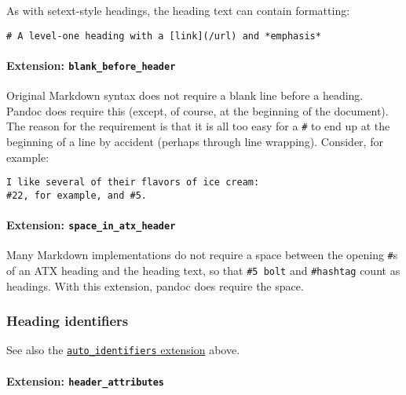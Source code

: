 \documentclass[
]{article}
\begin{document}
As with setext-style headings, the heading text can contain formatting:

\begin{verbatim}
# A level-one heading with a [link](/url) and *emphasis*
\end{verbatim}

\hypertarget{extension-blank_before_header}{%
\paragraph{\texorpdfstring{Extension:
\texttt{blank\_before\_header}}{Extension: blank\_before\_header}}\label{extension-blank_before_header}}

Original Markdown syntax does not require a blank line before a heading.
Pandoc does require this (except, of course, at the beginning of the
document). The reason for the requirement is that it is all too easy for
a \texttt{\#} to end up at the beginning of a line by accident (perhaps
through line wrapping). Consider, for example:

\begin{verbatim}
I like several of their flavors of ice cream:
#22, for example, and #5.
\end{verbatim}

\hypertarget{extension-space_in_atx_header}{%
\paragraph{\texorpdfstring{Extension:
\texttt{space\_in\_atx\_header}}{Extension: space\_in\_atx\_header}}\label{extension-space_in_atx_header}}

Many Markdown implementations do not require a space between the opening
\texttt{\#}s of an ATX heading and the heading text, so that
\texttt{\#5\ bolt} and \texttt{\#hashtag} count as headings. With this
extension, pandoc does require the space.

\hypertarget{heading-identifiers}{%
\subsubsection{Heading identifiers}\label{heading-identifiers}}

See also the
\protect\hyperlink{extension-auto_identifiers}{\texttt{auto\_identifiers}
extension} above.

\hypertarget{extension-header_attributes}{%
\paragraph{\texorpdfstring{Extension:
\texttt{header\_attributes}}{Extension: header\_attributes}}\label{extension-header_attributes}}
\end{document}
